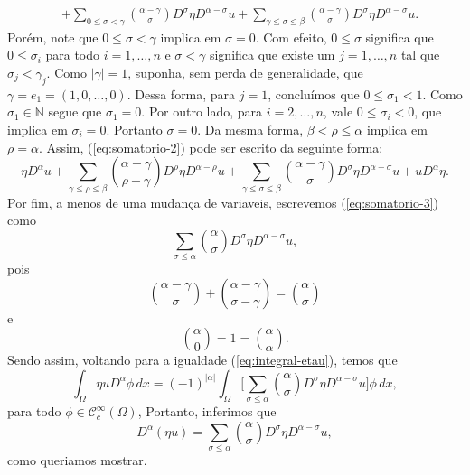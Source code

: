 \documentclass[a4paper, 11pt]{book}
\theoremstyle{definition}
\newcommand{\bN}{\mathbb{N}}
\newcommand{\cC}{\mathcal{C}}
\begin{document}
\begin{prf}
\begin{equation}
\begin{aligned}
            &+ \sum_{0 \leqslant \sigma < \gamma} \binom{\alpha - \gamma}{\sigma} D^{\sigma} \eta D^{\alpha - \sigma} u + \sum_{\gamma \leqslant \sigma \leqslant \beta} \binom{\alpha - \gamma}{\sigma} D^{\sigma} \eta D^{\alpha - \sigma} u.
           \end{aligned}
    \end{equation}
    Porém, note que $0 \leqslant \sigma < \gamma$ implica em $\sigma = 0$. Com efeito, $0 \leqslant \sigma$ significa que $0 \leqslant \sigma_i$ para todo $i = 1,\dots,n$ e $\sigma < \gamma$ significa que existe um $j = 1,\dots,n$ tal que $\sigma_j < \gamma_j$. Como $|\gamma| = 1$, suponha, sem perda de generalidade, que $\gamma = e_1 = (1,0,\dots,0)$.
    Dessa forma, para $j = 1$, concluímos que $0 \leqslant \sigma_1 < 1$.
    Como $\sigma_1 \in \bN$ segue que $\sigma_1 = 0$. Por outro lado, para $i = 2,\dots,n$, vale $0 \leqslant \sigma_i < 0$,
    que implica em $\sigma_i = 0$. Portanto $\sigma = 0$.
    Da mesma forma, $\beta < \rho \leqslant \alpha$ implica em $\rho =\alpha$.
    Assim, (\ref{eq:somatorio-2}) pode ser escrito da seguinte forma:
    \begin{equation} \label{eq:somatorio-3}
        \eta D^{\alpha} u + \sum_{\gamma \leqslant \rho \leqslant \beta} \binom{\alpha - \gamma}{\rho - \gamma} D^{\rho}\eta D^{\alpha - \rho} u + \sum_{\gamma \leqslant \sigma \leqslant \beta} \binom{\alpha - \gamma}{\sigma} D^{\sigma} \eta D^{\alpha - \sigma} u + 
        u D^{\alpha}\eta.
    \end{equation}
    Por fim, a menos de uma mudança de variaveis, escrevemos (\ref{eq:somatorio-3}) como
    \[
        \sum_{\sigma \leqslant \alpha} \binom{\alpha}{\sigma} D^{\sigma} \eta D^{\alpha - \sigma} u,
    \]
    pois
    \[
        \binom{\alpha - \gamma}{\sigma} + \binom{\alpha - \gamma}{\sigma - \gamma} = \binom{\alpha}{\sigma}
    \]
    e
    \[
        \binom{\alpha}{0} = 1 = \binom{\alpha}{\alpha}.
    \]
    Sendo assim, voltando para a igualdade (\ref{eq:integral-etau}), temos que
    \[
        \int_\Omega \eta u D^{\alpha}\phi \, dx = (-1)^{|\alpha|} \int_\Omega \bigg[\sum_{\sigma \leqslant \alpha} \binom{\alpha}{\sigma} D^{\sigma} \eta D^{\alpha - \sigma} u\bigg] \phi \,dx,
    \]
    para todo $\phi \in \cC^{\infty}_c(\Omega)$,
    Portanto, inferimos que
    \[
        D^\alpha (\eta u) = \sum_{\sigma \leqslant \alpha} \binom{\alpha}{\sigma} D^{\sigma} \eta D^{\alpha - \sigma} u,
    \]
    como queriamos mostrar.
\end{prf}
\end{document}
